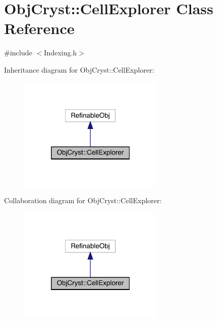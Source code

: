 \hypertarget{class_obj_cryst_1_1_cell_explorer}{}\section{Obj\+Cryst\+::Cell\+Explorer Class Reference}
\label{class_obj_cryst_1_1_cell_explorer}


{\ttfamily \#include $<$Indexing.\+h$>$}



Inheritance diagram for Obj\+Cryst\+::Cell\+Explorer\+:
\nopagebreak
\begin{figure}[H]
\begin{center}
\leavevmode
\includegraphics[width=195pt]{class_obj_cryst_1_1_cell_explorer__inherit__graph}
\end{center}
\end{figure}


Collaboration diagram for Obj\+Cryst\+::Cell\+Explorer\+:
\nopagebreak
\begin{figure}[H]
\begin{center}
\leavevmode
\includegraphics[width=195pt]{class_obj_cryst_1_1_cell_explorer__coll__graph}
\end{center}
\end{figure}
